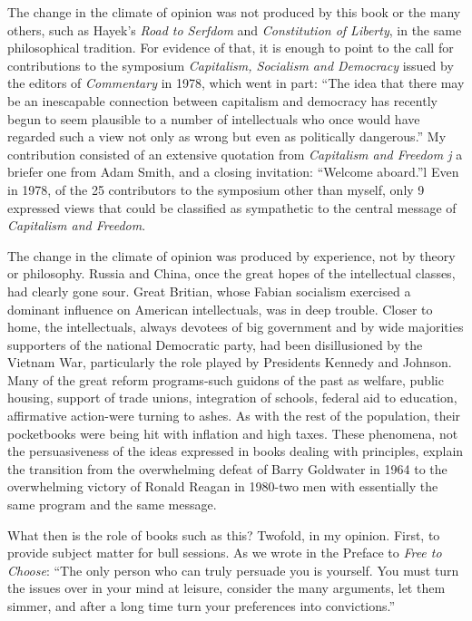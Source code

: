 \documentclass[11pt,openany]{book}
\begin{document}
The change in the climate of opinion was not produced by this book or the many others, such as Hayek's \emph{Road to Serfdom} and \emph{Constitution of Liberty}, in the same philosophical tradition. For evidence of that, it is enough to point to the call for contributions to the symposium \emph{Capitalism, Socialism and Democracy} issued by the editors of \emph{Commentary} in 1978, which went in part: ``The idea that there may be an inescapable connection between capitalism and democracy has recently begun to seem plausible to a number of intellectuals who once would have regarded such a view not only as wrong but even as politically dangerous.'' My contribution consisted of an extensive quotation from \emph{Capitalism and Freedom j} a briefer one from Adam Smith, and a closing invitation: ``Welcome aboard.''l Even in 1978, of the 25 contributors to the symposium other than myself, only 9 expressed views that could be classified as sympathetic to the central message of \emph{Capitalism and Freedom}.

The change in the climate of opinion was produced by experience, not by theory or philosophy. Russia and China, once the great hopes of the intellectual classes, had clearly gone sour. Great Britian, whose Fabian socialism exercised a dominant influence on American intellectuals, was in deep trouble. Closer to home, the intellectuals, always devotees of big government and by wide majorities supporters of the national Democratic party, had been disillusioned by the Vietnam War, particularly the role played by Presidents Kennedy and Johnson. Many of the great reform programs-such guidons of the past as welfare, public housing, support of trade unions, integration of schools, federal aid to education, affirmative action-were turning to ashes. As with the rest of the population, their pocketbooks were being hit with inflation and high taxes. These phenomena, not the persuasiveness of the ideas expressed in books dealing with principles, explain the transition from the overwhelming defeat of Barry Goldwater in 1964 to the overwhelming victory of Ronald Reagan in 1980-two men with essentially the same program and the same message.

What then is the role of books such as this? Twofold, in my opinion. First, to provide subject matter for bull sessions. As we wrote in the Preface to \emph{Free to Choose}: ``The only person who can truly persuade you is yourself. You must turn the issues over in your mind at leisure, consider the many arguments, let them simmer, and after a long time turn your preferences into convictions.''
\end{document}
